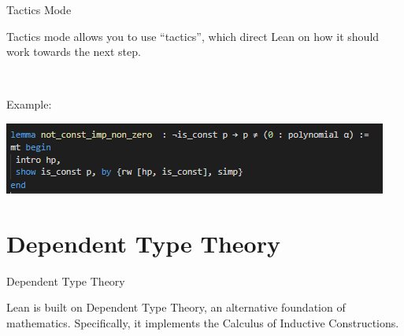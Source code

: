 \documentclass{beamer}
\begin{document}
\begin{frame}{Tactics  Mode} 

  Tactics mode allows you to use ``tactics'', which direct Lean on how it should work towards the next step.

  \

  Example:

  \includegraphics{tactics_example.png}

\end{frame}



\section {Dependent Type Theory}

\begin{frame}{Dependent Type Theory}

  Lean is built on Dependent Type Theory, an alternative foundation of mathematics. Specifically, it implements the Calculus of Inductive Constructions.
\end{frame}
\end{document}
